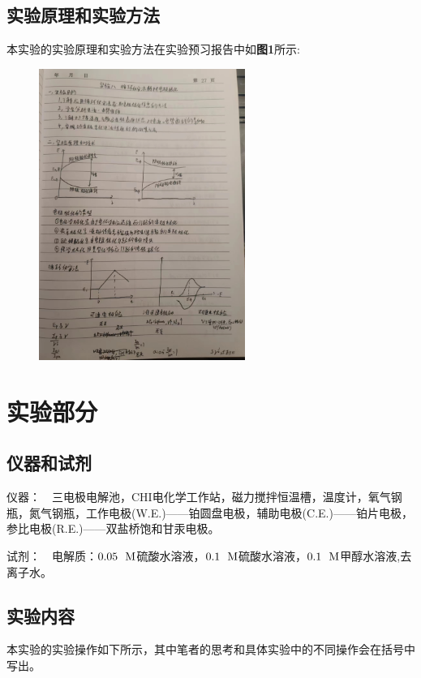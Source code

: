 \documentclass[12pt]{article}
\begin{document}
		\subsection{实验原理和实验方法}
		本实验的实验原理和实验方法在实验预习报告中如\textbf{图1}所示: \par
		\begin{figure}[h]
			\centering
			\includegraphics[width=0.6\textwidth]{1.png}
		\end{figure}
			
	     
    \section{实验部分}
    	\subsection{仪器和试剂}
    		仪器：\ \ 三电极电解池，CHI电化学工作站，磁力搅拌恒温槽，温度计，氧气钢瓶，氮气钢瓶，工作电极(W.E.)——铂圆盘电极，辅助电极(C.E.)——铂片电极，参比电极(R.E.)——双盐桥饱和甘汞电极。\par
			试剂：\ \  电解质：$0.05\ \ {\rm M}$硫酸水溶液，$0.1\ \ {\rm M}$硫酸水溶液，$0.1\ \ {\rm M}$甲醇水溶液,去离子水。\par 
    			
    	\subsection{实验内容}
		 本实验的实验操作如下所示，其中笔者的思考和具体实验中的不同操作会在括号中写出。\par
\end{document}
